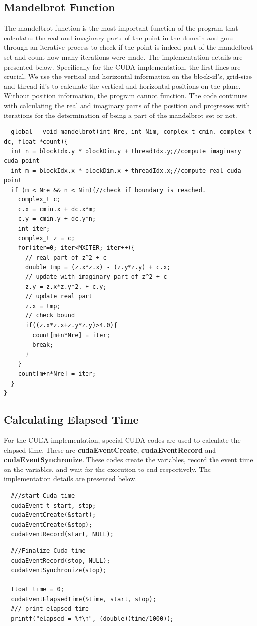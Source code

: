 \documentclass[12pt]{article}
\begin{document}
\subsection{Mandelbrot Function}
The mandelbrot function is the most important function of the program that calculates the real and imaginary parts of the point in the domain and goes through an iterative process to check if the point is indeed part of the mandelbrot set and count how many iterations were made. The implementation details are presented below. Specifically for the CUDA implementation, the first lines are crucial. We use the vertical and horizontal information on the block-id's, grid-size and thread-id's to calculate the vertical and horizontal positions on the plane. Without position information, the program cannot function. The code continues with calculating the real and imaginary parts of the position and progresses with iterations for the determination of being a part of the mandelbrot set or not. 
    \begin{verbatim}
__global__ void mandelbrot(int Nre, int Nim, complex_t cmin, complex_t dc, float *count){
  int n = blockIdx.y * blockDim.y + threadIdx.y;//compute imaginary cuda point
  int m = blockIdx.x * blockDim.x + threadIdx.x;//compute real cuda point
  if (m < Nre && n < Nim){//check if boundary is reached.
    complex_t c;
    c.x = cmin.x + dc.x*m;
    c.y = cmin.y + dc.y*n;
    int iter;
    complex_t z = c;
    for(iter=0; iter<MXITER; iter++){
      // real part of z^2 + c
      double tmp = (z.x*z.x) - (z.y*z.y) + c.x;
      // update with imaginary part of z^2 + c
      z.y = z.x*z.y*2. + c.y;
      // update real part
      z.x = tmp;
      // check bound
      if((z.x*z.x+z.y*z.y)>4.0){
        count[m+n*Nre] = iter;
        break;
      }
    }
    count[m+n*Nre] = iter;
  }
}
\end{verbatim}
\subsection{Calculating Elapsed Time}
For the CUDA implementation, special CUDA codes are used to calculate the elapsed time. These are \textbf{ cudaEventCreate}, \textbf{cudaEventRecord} and \textbf{cudaEventSynchronize}. These codes create the variables, record the event time on the variables, and wait for the execution to end respectively. The implementation details are presented below.
    \begin{verbatim}
  #//start Cuda time
  cudaEvent_t start, stop;
  cudaEventCreate(&start);
  cudaEventCreate(&stop);
  cudaEventRecord(start, NULL);
  \end{verbatim}
      \begin{verbatim}
  #//Finalize Cuda time
  cudaEventRecord(stop, NULL);
  cudaEventSynchronize(stop);

  float time = 0;
  cudaEventElapsedTime(&time, start, stop);
  #// print elapsed time
  printf("elapsed = %f\n", (double)(time/1000));
\end{verbatim}
\newpage
\end{document}
